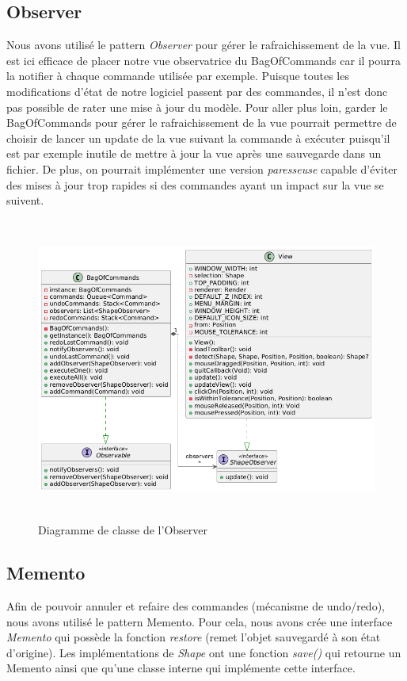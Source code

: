 \documentclass{article}
\begin{document}
\subsection{Observer}
Nous avons utilisé le pattern \textit{Observer} pour gérer le rafraichissement de la vue. Il est ici efficace de placer notre vue observatrice du BagOfCommands
car il pourra la notifier à chaque commande utilisée par exemple. Puisque toutes les modifications d'état de notre logiciel passent par des commandes, il n'est 
donc pas possible de rater une mise à jour du modèle. Pour aller plus loin, garder le BagOfCommands pour gérer le rafraichissement de la vue pourrait permettre 
de choisir de lancer un update de la vue suivant la commande à exécuter puisqu'il est par exemple inutile de mettre à jour la vue après une sauvegarde dans un fichier.
De plus, on pourrait implémenter une version \textit{paresseuse} capable d'éviter des mises à jour trop rapides si des commandes ayant un impact sur la vue se suivent.
\begin{figure}[h]
    \centering
    \includegraphics[width=\textwidth,height=10.0cm,keepaspectratio]{observer.png}
    \caption{Diagramme de classe de l'Observer}
    \label{Observer}
\end{figure}
\FloatBarrier

\subsection{Memento}
Afin de pouvoir annuler et refaire des commandes (mécanisme de undo/redo), nous avons utilisé le pattern Memento.
Pour cela, nous avons crée une interface \textit{Memento} qui possède la fonction \textit{restore} (remet l'objet sauvegardé à son état d'origine).
Les implémentations de \textit{Shape} ont une fonction \textit{save()} qui retourne un Memento ainsi que qu'une classe interne qui implémente cette interface.
\end{document}

